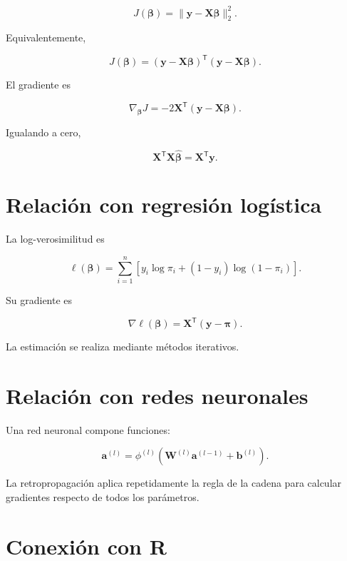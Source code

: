 \documentclass[
  spanish,
  11pt,
  letterpaper,
  DIV=11,
  numbers=noendperiod]{scrreprt}
\theoremstyle{definition}
\theoremstyle{plain}
\theoremstyle{definition}
\theoremstyle{remark}
\begin{document}
\[
J(\boldsymbol{\beta})
=
\|
\mathbf{y}
-
\mathbf{X}\boldsymbol{\beta}
\|_2^2.
\]

Equivalentemente,

\[
J(\boldsymbol{\beta})
=
(
\mathbf{y}
-
\mathbf{X}\boldsymbol{\beta}
)^{\mathsf T}
(
\mathbf{y}
-
\mathbf{X}\boldsymbol{\beta}
).
\]

El gradiente es

\[
\nabla_{\boldsymbol{\beta}}J
=
-2
\mathbf{X}^{\mathsf T}
(
\mathbf{y}
-
\mathbf{X}\boldsymbol{\beta}
).
\]

Igualando a cero,

\[
\mathbf{X}^{\mathsf T}
\mathbf{X}
\widehat{\boldsymbol{\beta}}
=
\mathbf{X}^{\mathsf T}
\mathbf{y}.
\]

\section{Relación con regresión
logística}\label{relaciuxf3n-con-regresiuxf3n-loguxedstica-1}

La log-verosimilitud es

\[
\ell(\boldsymbol{\beta})
=
\sum_{i=1}^{n}
\left[
y_i\log\pi_i
+
(1-y_i)\log(1-\pi_i)
\right].
\]

Su gradiente es

\[
\nabla\ell(\boldsymbol{\beta})
=
\mathbf{X}^{\mathsf T}
(
\mathbf{y}
-
\boldsymbol{\pi}
).
\]

La estimación se realiza mediante métodos iterativos.

\section{Relación con redes
neuronales}\label{relaciuxf3n-con-redes-neuronales-1}

Una red neuronal compone funciones:

\[
\mathbf{a}^{(l)}
=
\phi^{(l)}
\left(
\mathbf{W}^{(l)}
\mathbf{a}^{(l-1)}
+
\mathbf{b}^{(l)}
\right).
\]

La retropropagación aplica repetidamente la regla de la cadena para
calcular gradientes respecto de todos los parámetros.

\section{Conexión con R}\label{conexiuxf3n-con-r-3}
\end{document}
